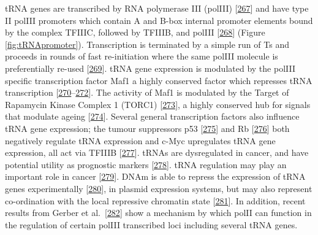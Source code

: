 \documentclass[
]{book}
\begin{document}
tRNA genes are transcribed by RNA polymerase III (polIII) {[}\protect\hyperlink{ref-Schramm2002}{267}{]} and have type II polIII promoters which contain A and B-box internal promoter elements bound by the complex TFIIIC, followed by TFIIIB, and polIII {[}\protect\hyperlink{ref-Canella2010}{268}{]} (Figure \ref{fig:tRNApromoter}).
Transcription is terminated by a simple run of Ts and proceeds in rounds of fast re-initiation where the same polIII molecule is preferentially re-used {[}\protect\hyperlink{ref-Dieci1996}{269}{]}.
tRNA gene expression is modulated by the polIII specific transcription factor Maf1 a highly conserved factor which represses tRNA transcription {[}\protect\hyperlink{ref-Murawski1994}{270}--\protect\hyperlink{ref-Vorlander2020}{272}{]}.
The activity of Maf1 is modulated by the Target of Rapamycin Kinase Complex 1 (TORC1) {[}\protect\hyperlink{ref-Mange2017}{273}{]}, a highly conserved hub for signals that modulate ageing {[}\protect\hyperlink{ref-Kennedy2016}{274}{]}.
Several general transcription factors also influence tRNA gene expression; the tumour suppressors p53 {[}\protect\hyperlink{ref-Crighton2003}{275}{]} and Rb {[}\protect\hyperlink{ref-Sutcliffe2000}{276}{]} both negatively regulate tRNA expression and c-Myc upregulates tRNA gene expression, all act via TFIIIB {[}\protect\hyperlink{ref-Gomez-Roman2003}{277}{]}.
tRNAs are dysregulated in cancer, and have potential utility as prognostic markers {[}\protect\hyperlink{ref-Krishnan2016}{278}{]}.
tRNA regulation may play an important role in cancer {[}\protect\hyperlink{ref-Huang2018}{279}{]}.
DNAm is able to repress the expression of tRNA genes experimentally {[}\protect\hyperlink{ref-Besser1990}{280}{]}, in plasmid expression systems, but may also represent co-ordination with the local repressive chromatin state {[}\protect\hyperlink{ref-Varshney2015}{281}{]}.
In addition, recent results from Gerber et al.~{[}\protect\hyperlink{ref-Gerber2020}{282}{]} show a mechanism by which polII can function in the regulation of certain polIII transcribed loci including several tRNA genes.
\end{document}
